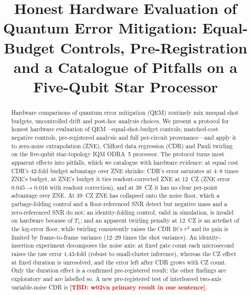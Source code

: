 \documentclass[conference]{IEEEtran}
\newcommand{\TBD}[1]{\textcolor{red}{\textbf{[TBD: #1]}}}
\begin{document}
\title{Honest Hardware Evaluation of Quantum Error Mitigation: Equal-Budget Controls,
Pre-Registration and a Catalogue of Pitfalls on a Five-Qubit Star Processor}

\author{
}

\maketitle

\begin{abstract}
Hardware comparisons of quantum error mitigation (QEM) routinely mix unequal shot budgets,
uncontrolled drift and post-hoc analysis choices. We present a protocol for honest hardware
evaluation of QEM---equal-shot-budget controls, matched-cost negative controls,
pre-registered analysis and full per-circuit provenance---and apply it to zero-noise
extrapolation (ZNE), Clifford data regression (CDR) and Pauli twirling on the five-qubit
star-topology IQM ODRA~5 processor. The protocol turns most apparent effects into pitfalls,
which we catalogue with hardware evidence: at equal cost CDR's 42-fold budget advantage over
ZNE shrinks: CDR's error saturates at 4--8 times ZNE's budget, at ZNE's budget it ties
readout-corrected ZNE at 12~CZ (ZNE error $0.045\to0.016$ with readout correction), and at
39~CZ it has no clear per-point advantage over ZNE. At 39~CZ ZNE has collapsed onto the
noise floor, which a garbage-folding control and a floor-referenced SNR detect but negative
mass and a zero-referenced SNR do not; an identity-folding control, valid in simulation, is
invalid on hardware because of $T_1$; and an apparent twirling penalty at 12~CZ is an artefact
of the log-error floor, while twirling consistently raises the CDR fit's $r^2$ and its gain is
limited by frame-to-frame variance (12--29 times the shot variance). An identity-insertion
experiment decomposes the noise axis: at fixed gate count each microsecond raises the raw
error $1.43$-fold (robust to small-cluster inference), whereas the CZ effect at fixed
duration is unresolved, and the error left after CDR grows with CZ count. Only the duration
effect is a confirmed pre-registered result; the other findings are exploratory and are
labelled so. A new pre-registered test of interleaved two-axis variable-noise CDR is
\TBD{w02vn primary result in one sentence}.
\end{abstract}
\end{document}

